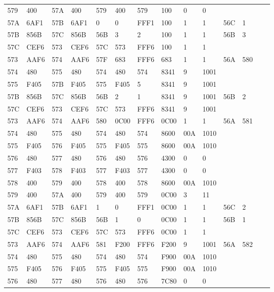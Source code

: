 \begin{tabular}{|*{14}{l|}}
579	& 400	& 57A	& 400	& 579	& 400	& 579	& 100	& 0     & 0     &       & \\
57A	& 6AF1	& 57B	& 6AF1	& 0	    & 0	    & FFF1	& 100	& 1     & 1     & 56C	& 1\\
57B	& 856B	& 57C	& 856B	& 56B	& 3 	& 2     & 100	& 1	    & 1     & 56B	& 3\\
57C	& CEF6	& 573	& CEF6	& 57C	& 573	& FFF6	& 100	& 1     & 1	    & 	    & \\
573	& AAF6	& 574	& AAF6	& 57F	& 683	& FFF6	& 683	& 1     & 1	    & 56A	& 580\\
574	& 480	& 575	& 480	& 574	& 480	& 574	& 8341	& 9     & 1001	& 	    & \\
575	& F405	& 57B	& F405	& 575	& F405	& 5	    & 8341	& 9     & 1001	& 	    & \\
57B	& 856B	& 57C	& 856B	& 56B	& 2	    & 1     & 8341	& 9	    & 1001	& 56B	& 2\\
57C	& CEF6	& 573	& CEF6	& 57C	& 573	& FFF6	& 8341	& 9	    & 1001	& 	    & \\
573	& AAF6	& 574	& AAF6	& 580	& 0C00	& FFF6	& 0C00	& 1	    & 1	    & 56A	& 581\\
574	& 480	& 575	& 480	& 574	& 480	& 574	& 8600	& 00A	& 1010	& 	    & \\
575	& F405	& 576	& F405	& 575	& F405	& 575	& 8600	& 00A	& 1010	& 	    & \\
576	& 480	& 577	& 480	& 576	& 480	& 576	& 4300	& 0	    & 0	    & 	    & \\
577	& F403	& 578	& F403	& 577	& F403	& 577	& 4300	& 0	    & 0	    & 	    & \\
578	& 400	& 579	& 400	& 578	& 400	& 578	& 8600	& 00A	& 1010	& 	    & \\
579	& 400	& 57A	& 400	& 579	& 400	& 579	& 0C00	& 3	    & 11	& 	    & \\
57A	& 6AF1	& 57B	& 6AF1	& 1	    & 0	    & FFF1	& 0C00	& 1	    & 1 	& 56C	& 2\\
57B	& 856B	& 57C	& 856B	& 56B	& 1	    & 0	    & 0C00	& 1	    & 1 	& 56B	& 1\\
57C	& CEF6	& 573	& CEF6	& 57C	& 573	& FFF6	& 0C00	& 1 	& 1 	&   	& \\
573	& AAF6	& 574	& AAF6	& 581	& F200	& FFF6	& F200	& 9 	& 1001	& 56A	& 582\\
574	& 480	& 575	& 480	& 574	& 480	& 574	& F900	& 00A	& 1010	&   	& \\
575	& F405	& 576	& F405	& 575	& F405	& 575	& F900	& 00A	& 1010	&   	& \\
576	& 480	& 577	& 480	& 576	& 480	& 576	& 7C80	& 0 	& 0 	&   	& \\

\end{tabular}
